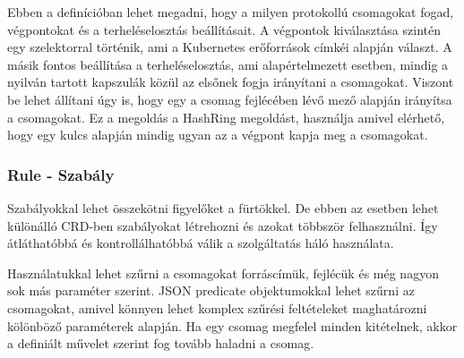Ebben a definícióban lehet megadni, hogy a milyen protokollú csomagokat fogad, végpontokat
és a terheléselosztás beállításait. A végpontok kiválasztása szintén egy szelektorral
történik, ami a Kubernetes erőforrások címkéi alapján választ. A másik fontos beállítása
a terheléselosztás, ami alapértelmezett esetben, mindig a nyilván tartott kapszulák 
közül az elsőnek fogja irányítani a csomagokat. Viszont be lehet állítani úgy is, hogy
egy a csomag fejlécében lévő mező alapján irányítsa a csomagokat. Ez a megoldás a
HashRing megoldást, használja amivel elérhető, hogy egy kulcs alapján mindig ugyan az
a végpont kapja meg a csomagokat. 

\subsubsection{Rule - Szabály}

Szabályokkal lehet összekötni figyelőket a fürtökkel. De ebben az esetben lehet különálló
CRD-ben szabályokat létrehozni és azokat többször felhasználni. Így átláthatóbbá és 
kontrollálhatóbbá válik a szolgáltatás háló használata. 

Használatukkal lehet szűrni a csomagokat forráscímük, fejlécük és még nagyon sok más 
paraméter szerint. JSON predicate objektumokkal lehet szűrni az csomagokat, amivel 
könnyen lehet komplex szűrési feltételeket maghatározni kölönböző paraméterek alapján. Ha 
egy csomag megfelel minden kitételnek, akkor a definiált művelet szerint fog tovább 
haladni a csomag. 